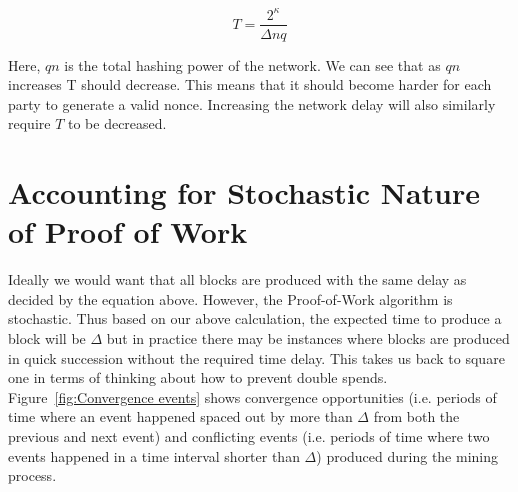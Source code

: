 \begin{equation}
    T = \frac{2^\kappa}{\Delta nq}
\end{equation}

Here, $qn$ is the total hashing power of the network. We can see that as $qn$ increases T should decrease. This means that it should become harder for each party to generate a valid nonce.
Increasing the network delay will also similarly require $T$ to be decreased.

\section{Accounting for Stochastic Nature of Proof of Work}

Ideally we would want that all blocks are produced with the same delay as decided by the equation above. However, the Proof-of-Work algorithm is stochastic. Thus based on our above calculation, the expected time to produce a block will be $\Delta$ but in practice there may be instances where blocks are produced in quick succession without the required time delay. This takes us back to square one in terms of thinking about how to prevent double spends. Figure~\ref{fig:Convergence events} shows convergence opportunities (i.e. periods of time where an event happened spaced out by more than $\Delta$ from both the previous and next event) and conflicting events (i.e. periods of time where two events happened in a time interval shorter than $\Delta$) produced during the mining process.

